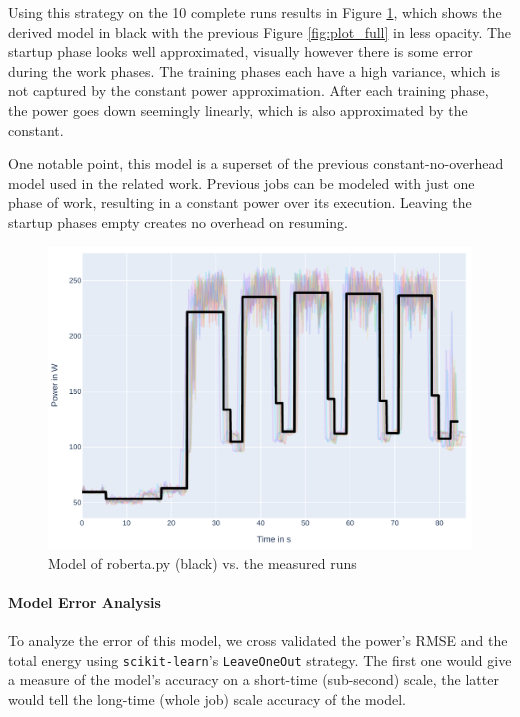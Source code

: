 Using this strategy on the 10 complete runs results in Figure \ref{fig:model_overlaid}, which shows the derived model in black with the previous Figure \ref{fig:plot_full} in less opacity. 
The startup phase looks well approximated, visually however there is some error during the work phases.
The training phases each have a high variance, which is not captured by the constant power approximation. After each training  phase, the power goes down seemingly linearly, which is also approximated by the constant.

One notable point, this model is a superset of the previous constant-no-overhead model used in the related work.
Previous jobs can be modeled with just one phase of work, resulting in a constant power over its execution. Leaving the startup phases empty creates no overhead on resuming.

\begin{figure}
    \includegraphics[width=\linewidth]{power-measurements/model_overlaid.pdf}
    \caption{Model of roberta.py (black) vs. the measured runs}
    \label{fig:model_overlaid}
\end{figure}

\paragraph{Model Error Analysis}

To analyze the error of this model, we cross validated the power's RMSE and the total energy using \verb|scikit-learn|'s \verb|LeaveOneOut| strategy. 
The first one would give a measure of the model's accuracy on a short-time (sub-second) scale, the latter would  tell the long-time (whole job) scale accuracy of the model.

